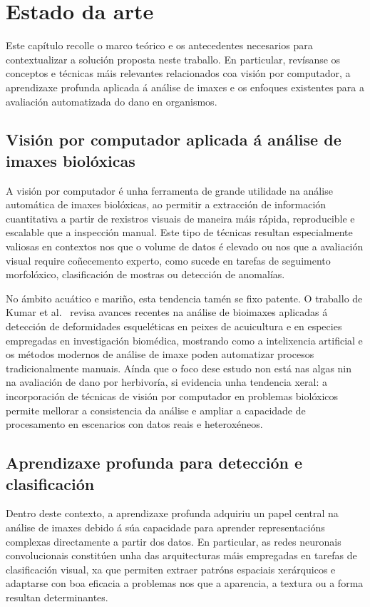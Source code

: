\chapter{Estado da arte}
\label{chap:estado-da-arte}

Este capítulo recolle o marco teórico e os antecedentes necesarios para contextualizar a solución
proposta neste traballo. En particular, revísanse os conceptos e técnicas máis relevantes
relacionados coa visión por computador, a aprendizaxe profunda aplicada á análise de imaxes e os
enfoques existentes para a avaliación automatizada do dano en organismos.

\section{Visión por computador aplicada á análise de imaxes biolóxicas}
A visión por computador é unha ferramenta de grande utilidade na
análise automática de imaxes biolóxicas, ao permitir a extracción de información cuantitativa a partir
de rexistros visuais de maneira máis rápida, reproducible e escalable que a inspección manual. Este
tipo de técnicas resultan especialmente valiosas en contextos nos que o volume de datos é elevado ou
nos que a avaliación visual require coñecemento experto, como sucede en tarefas de seguimento
morfolóxico, clasificación de mostras ou detección de anomalías.

No ámbito acuático e mariño, esta tendencia tamén se fixo patente. O traballo de Kumar et
al.~\cite{articuloBiomedical} revisa avances recentes na análise de bioimaxes aplicadas á detección de
deformidades esqueléticas en peixes de acuicultura e en especies empregadas en investigación
biomédica, mostrando como a intelixencia artificial e os métodos modernos de análise de imaxe poden
automatizar procesos tradicionalmente manuais. Aínda que o foco dese estudo non está nas algas nin na
avaliación de dano por herbivoría, si evidencia unha tendencia xeral: a incorporación de técnicas de
visión por computador en problemas biolóxicos permite mellorar a consistencia da análise e ampliar a
capacidade de procesamento en escenarios con datos reais e heteroxéneos.

\section{Aprendizaxe profunda para detección e clasificación}
Dentro deste contexto, a aprendizaxe profunda adquiriu un papel central na análise de imaxes debido á
súa capacidade para aprender representacións complexas directamente a partir dos datos. En
particular, as redes neuronais convolucionais constitúen unha das arquitecturas máis empregadas en
tarefas de clasificación visual, xa que permiten extraer patróns espaciais xerárquicos e adaptarse con
boa eficacia a problemas nos que a aparencia, a textura ou a forma resultan determinantes.

